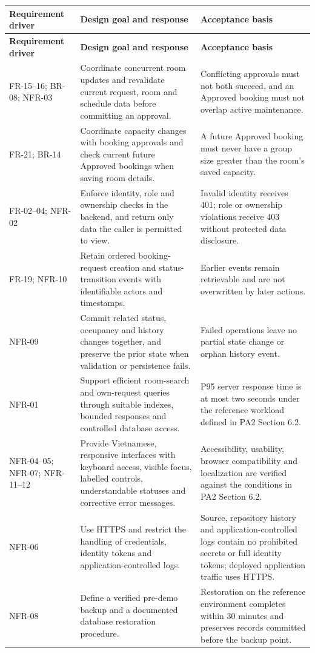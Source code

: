 \begin{longtable}{|p{}|p{}|p{}|}
\hline
\textbf{Requirement driver} & \textbf{Design goal and response} & \textbf{Acceptance basis} \\
\hline
\endfirsthead
\hline
\textbf{Requirement driver} & \textbf{Design goal and response} & \textbf{Acceptance basis} \\
\hline
\endhead
FR-15--16; BR-08; NFR-03 &
Coordinate concurrent room updates and revalidate current request, room and schedule data before committing an approval. &
Conflicting approvals must not both succeed, and an Approved booking must not overlap active maintenance. \\
\hline
FR-21; BR-14 &
Coordinate capacity changes with booking approvals and check current future Approved bookings when saving room details. &
A future Approved booking must never have a group size greater than the room's saved capacity. \\
\hline
FR-02--04; NFR-02 &
Enforce identity, role and ownership checks in the backend, and return only data the caller is permitted to view. &
Invalid identity receives 401; role or ownership violations receive 403 without protected data disclosure. \\
\hline
FR-19; NFR-10 &
Retain ordered booking-request creation and status-transition events with identifiable actors and timestamps. &
Earlier events remain retrievable and are not overwritten by later actions. \\
\hline
NFR-09 &
Commit related status, occupancy and history changes together, and preserve the prior state when validation or persistence fails. &
Failed operations leave no partial state change or orphan history event. \\
\hline
NFR-01 &
Support efficient room-search and own-request queries through suitable indexes, bounded responses and controlled database access. &
P95 server response time is at most two seconds under the reference workload defined in PA2 Section 6.2. \\
\hline
NFR-04--05; NFR-07; NFR-11--12 &
Provide Vietnamese, responsive interfaces with keyboard access, visible focus, labelled controls, understandable statuses and corrective error messages. &
Accessibility, usability, browser compatibility and localization are verified against the conditions in PA2 Section 6.2. \\
\hline
NFR-06 &
Use HTTPS and restrict the handling of credentials, identity tokens and application-controlled logs. &
Source, repository history and application-controlled logs contain no prohibited secrets or full identity tokens; deployed application traffic uses HTTPS. \\
\hline
NFR-08 &
Define a verified pre-demo backup and a documented database restoration procedure. &
Restoration on the reference environment completes within 30 minutes and preserves records committed before the backup point. \\
\hline
\end{longtable}

